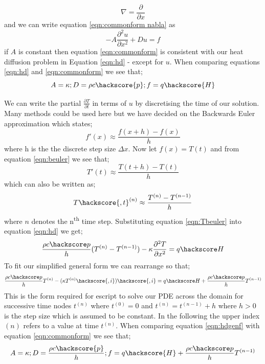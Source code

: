 \begin{equation}
\nabla = \frac{\partial}{\partial x}
\end{equation}
and we can write equation \ref{eqn:commonform nabla} as
\begin{equation}\label{eqn:commonform}
-A\frac{\partial^{2}u}{\partial x^{2}} + Du = f
\end{equation}
if $A$ is constant then equation \ref{eqn:commonform} is consistent with our heat diffusion problem in Equation \ref{eqn:hd} - except for $u$. When comparing equations \eqref{eqn:hd} and \eqref{eqn:commonform} we see that;
\begin{equation}
A = \kappa; D = \rho c \hackscore{p}; f = q \hackscore{H}
\end{equation}

We can write the partial $\frac{\partial T}{\partial t}$ in terms of $u$ by discretising the time of our solution. Many methods could be used here but we have decided on the Backwards Euler approximation which states;
\begin{equation}
f'(x) \approx \frac{f(x+h)-f(x)}{h}
\label{eqn:beuler}
\end{equation}
where h is the the discrete step size $\Delta x$.
Now let $f(x) = T(t)$ and from equation \ref{eqn:beuler} we see that;
\begin{equation}
T'(t) \approx \frac{T(t+h) - T(t)}{h}
\end{equation}
which can also be written as;
\begin{equation}
T\hackscore{,t}^{(n)} \approx \frac{T^{(n)} - T^{(n-1)}}{h}
\label{eqn:Tbeuler}
\end{equation}
where $n$ denotes the n\textsuperscript{th} time step. Substituting equation \ref{eqn:Tbeuler} into equation \ref{eqn:hd} we get;
\begin{equation}
\frac{\rho c\hackscore p}{h} (T^{(n)} - T^{(n-1)}) - \kappa \frac{\partial^{2} T}{\partial x^{2}} = q\hackscore H 
\label{eqn:hddisc}
\end{equation}
To fit our simplified general form we can rearrange so that;
\begin{equation}
\frac{\rho c\hackscore p}{h} T^{(n)} - (\kappa T^{(n)}\hackscore{,i})\hackscore{,i} = q\hackscore H +  \frac{\rho c\hackscore p}{h} T^{(n-1)}
\label{eqn:hdgenf}
\end{equation}
This is the form required for escript to solve our PDE across the domain for successive time nodes $t^{(n)}$ where 
$t^{(0)}=0$ and  $t^{(n)}=t^{(n-1)}+h$ where $h>0$ is the step size which is assumed to be constant. 
In the following the upper index ${(n)}$ refers to a value at time $t^{(n)}$. When comparing equation \ref{eqn:hdgenf} with equation \ref{eqn:commonform} we see that;
\begin{equation}
A = \kappa; D = \frac{\rho c \hackscore{p}}{h}; f = q \hackscore{H} + \frac{\rho c\hackscore p}{h} T^{(n-1)}
\end{equation}


